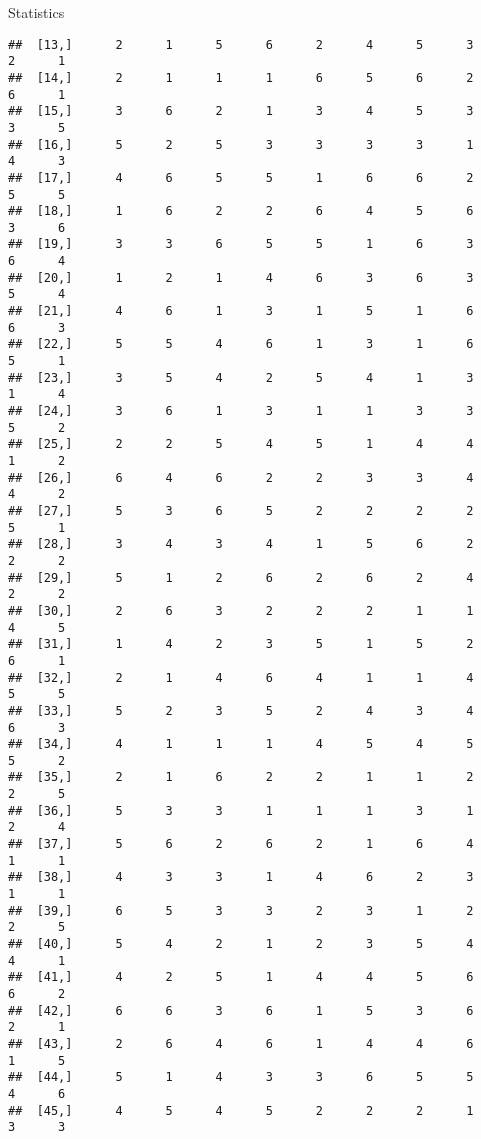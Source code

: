 \documentclass[
  ignorenonframetext,
]{beamer}
\begin{document}
\begin{frame}[fragile]{Statistics}
\begin{verbatim}
##  [13,]      2      1      5      6      2      4      5      3      2      1
##  [14,]      2      1      1      1      6      5      6      2      6      1
##  [15,]      3      6      2      1      3      4      5      3      3      5
##  [16,]      5      2      5      3      3      3      3      1      4      3
##  [17,]      4      6      5      5      1      6      6      2      5      5
##  [18,]      1      6      2      2      6      4      5      6      3      6
##  [19,]      3      3      6      5      5      1      6      3      6      4
##  [20,]      1      2      1      4      6      3      6      3      5      4
##  [21,]      4      6      1      3      1      5      1      6      6      3
##  [22,]      5      5      4      6      1      3      1      6      5      1
##  [23,]      3      5      4      2      5      4      1      3      1      4
##  [24,]      3      6      1      3      1      1      3      3      5      2
##  [25,]      2      2      5      4      5      1      4      4      1      2
##  [26,]      6      4      6      2      2      3      3      4      4      2
##  [27,]      5      3      6      5      2      2      2      2      5      1
##  [28,]      3      4      3      4      1      5      6      2      2      2
##  [29,]      5      1      2      6      2      6      2      4      2      2
##  [30,]      2      6      3      2      2      2      1      1      4      5
##  [31,]      1      4      2      3      5      1      5      2      6      1
##  [32,]      2      1      4      6      4      1      1      4      5      5
##  [33,]      5      2      3      5      2      4      3      4      6      3
##  [34,]      4      1      1      1      4      5      4      5      5      2
##  [35,]      2      1      6      2      2      1      1      2      2      5
##  [36,]      5      3      3      1      1      1      3      1      2      4
##  [37,]      5      6      2      6      2      1      6      4      1      1
##  [38,]      4      3      3      1      4      6      2      3      1      1
##  [39,]      6      5      3      3      2      3      1      2      2      5
##  [40,]      5      4      2      1      2      3      5      4      4      1
##  [41,]      4      2      5      1      4      4      5      6      6      2
##  [42,]      6      6      3      6      1      5      3      6      2      1
##  [43,]      2      6      4      6      1      4      4      6      1      5
##  [44,]      5      1      4      3      3      6      5      5      4      6
##  [45,]      4      5      4      5      2      2      2      1      3      3

\end{verbatim}
\end{frame}
\end{document}
